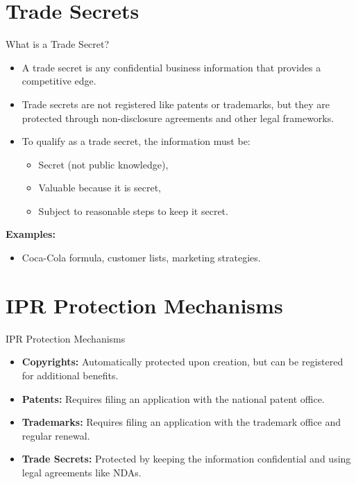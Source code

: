\documentclass{beamer}
\begin{document}
	\section{Trade Secrets}
	\begin{frame}{What is a Trade Secret?}
		\begin{itemize}
			\item A trade secret is any confidential business information that provides a competitive edge.
			\item Trade secrets are not registered like patents or trademarks, but they are protected through non-disclosure agreements and other legal frameworks.
			\item To qualify as a trade secret, the information must be:
			\begin{itemize}
				\item Secret (not public knowledge),
				\item Valuable because it is secret,
				\item Subject to reasonable steps to keep it secret.
			\end{itemize}
		\end{itemize}
		\vspace{0.5cm}
		\textbf{Examples:}
		\begin{itemize}
			\item Coca-Cola formula, customer lists, marketing strategies.
		\end{itemize}
	\end{frame}
	
	\section{IPR Protection Mechanisms}
	\begin{frame}{IPR Protection Mechanisms}
		\begin{itemize}
			\item \textbf{Copyrights:} Automatically protected upon creation, but can be registered for additional benefits.
			\item \textbf{Patents:} Requires filing an application with the national patent office.
			\item \textbf{Trademarks:} Requires filing an application with the trademark office and regular renewal.
			\item \textbf{Trade Secrets:} Protected by keeping the information confidential and using legal agreements like NDAs.
		\end{itemize}
	\end{frame}
	
\end{document}
